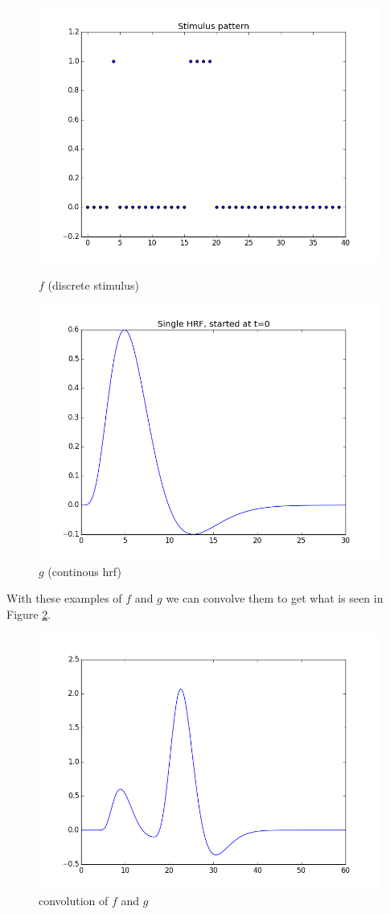 \documentclass[11pt]{article}
\begin{document}
\begin{figure}[ht]
\centering
\begin{minipage}[b]{0.45\linewidth}
	\centering
	\includegraphics[width=.8\linewidth]{convolution/images/on_off_pattern.png} 
	\caption{$f$ (discrete stimulus)}
	\label{fig:on_off}
\end{minipage}	
\quad
\begin{minipage}[b]{0.45\linewidth}
	\centering
	\includegraphics[width=.8\linewidth]{convolution/images/hrf_pattern.png} 
	\caption{$g$ (continous hrf)}
	\label{fig:hrf}
\end{minipage}
\end{figure}

With these examples of  $f$ and $g$ we can convolve them to get what is seen in Figure \ref{fig:convolve1}.

\begin{figure}[ht]
	\centering
	\includegraphics[width=.5\linewidth]{convolution/images/initial_convolved.png}
	\caption{convolution of $f$ and $g$}
	\label{fig:convolve1}
\end{figure}
\end{document}
